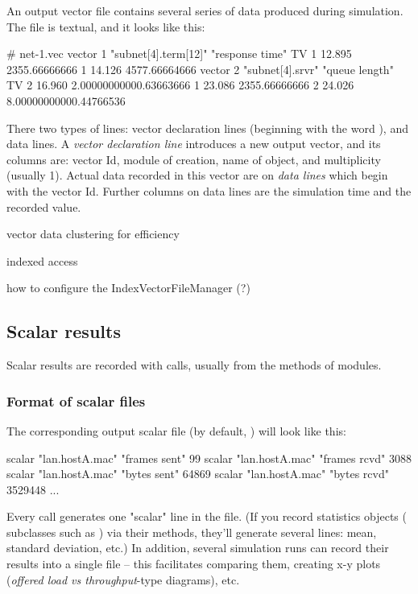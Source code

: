 An output vector file contains several
series of data produced during simulation. The file is textual, and it
looks like this:

\begin{filelisting}
# net-1.vec
vector 1   "subnet[4].term[12]"  "response time"  TV
1  12.895  2355.66666666
1  14.126  4577.66664666
vector 2   "subnet[4].srvr"  "queue length"  TV
2  16.960  2.00000000000.63663666
1  23.086  2355.66666666
2  24.026  8.00000000000.44766536
\end{filelisting}

There two types of lines: vector declaration lines (beginning with
the word ), and data lines.
A \textit{vector declaration line} introduces a new output vector, and
its columns are: vector Id, module of creation, name of 
object, and multiplicity (usually 1). Actual data recorded in this
vector are on \textit{data lines} which begin with the vector Id.
Further columns on data lines are the simulation time and the recorded value.

vector data clustering for efficiency

indexed access

how to configure the IndexVectorFileManager (?)


\subsection{Scalar results}
\label{sec:ch-ana-sim:output-scalars}

Scalar results are recorded with  calls,
usually from the  methods of modules.


\subsubsection{Format of scalar files}

The corresponding output scalar file (by default, )
will look like this:

\begin{filelisting}
scalar "lan.hostA.mac" "frames sent"  99
scalar "lan.hostA.mac" "frames rcvd"  3088
scalar "lan.hostA.mac" "bytes sent"   64869
scalar "lan.hostA.mac" "bytes rcvd"   3529448
...
\end{filelisting}

Every  call generates one "scalar" line in the file.
(If you record statistics objects ( subclasses
such as ) via their  methods,
they'll generate several lines: mean, standard deviation, etc.)
In addition, several simulation runs can record their results into a single file --
this facilitates comparing them, creating x-y plots
(\textit{offered load vs throughput}-type diagrams), etc.



